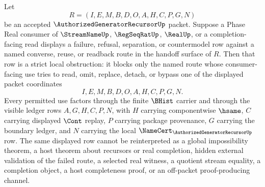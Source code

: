 \begin{corollary}
\label{cor:authorized-generator-recursor-phase-real-readiness-strict-obstruction}
Let
$$
R=(I,E,M,B,D,O,A,H,C,P,G,N)
$$
be an accepted $\AuthorizedGeneratorRecursorUp$ packet. Suppose a Phase Real consumer of $\StreamNameUp$, $\RegSeqRatUp$, $\RealUp$, or a completion-facing read displays a failure, refusal, separation, or countermodel row against a named converse, reuse, or readback route in the handoff surface of $R$. Then that row is a strict local obstruction: it blocks only the named route whose consumer-facing use tries to read, omit, replace, detach, or bypass one of the displayed packet coordinates
$$
I,E,M,B,D,O,A,H,C,P,G,N.
$$
Every permitted use factors through the finite $\BHist$ carrier and through the visible ledger rows $A,G,H,C,P,N$, with $H$ carrying componentwise $\hsame$, $C$ carrying displayed $\Cont$ replay, $P$ carrying package provenance, $G$ carrying the boundary ledger, and $N$ carrying the local $\NameCert_{\AuthorizedGeneratorRecursorUp}$ row. The same displayed row cannot be reinterpreted as a global impossibility theorem, a host theorem about recursors or real completion, hidden external validation of the failed route, a selected real witness, a quotient stream equality, a completion object, a host completeness proof, or an off-packet proof-producing channel.
\end{corollary}

